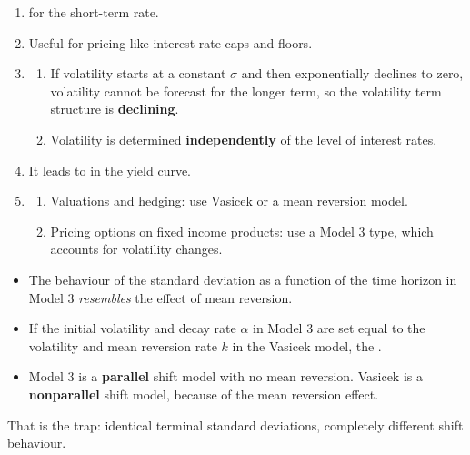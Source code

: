 
\begin{mrkeybox}[title={Model 3 effectiveness}]
\begin{enumerate}
\item {} for the short-term rate.
\item Useful for pricing  like interest rate caps and floors.
\item {}
  \begin{enumerate}[label=\alph*)]
  \item If volatility starts at a constant $\sigma$ and then exponentially declines to zero,
        volatility cannot be forecast for the longer term, so the volatility term structure is
        \textbf{declining}.
  \item Volatility is determined \textbf{independently} of the level of interest rates.
  \end{enumerate}
\item It leads to  in the yield curve.
\item {}
  \begin{enumerate}[label=\alph*)]
  \item Valuations and hedging: use Vasicek or a mean reversion model.
  \item Pricing options on fixed income products: use a Model 3 type, which accounts for
        volatility changes.
  \end{enumerate}
\end{enumerate}
\end{mrkeybox}

\begin{mrtrapbox}[title={Model 3 versus Vasicek --- the sibling pair}]
\begin{itemize}
\item The behaviour of the standard deviation as a function of the time horizon in Model 3
      \textit{resembles} the effect of mean reversion.
\item If the initial volatility and decay rate $\alpha$ in Model 3 are set equal to the
      volatility and mean reversion rate $k$ in the Vasicek model, the .
\item {} Model 3 is a \textbf{parallel} shift model with no mean reversion.
      Vasicek is a \textbf{nonparallel} shift model, because of the mean reversion effect.
\end{itemize}
That is the trap: identical terminal standard deviations, completely different shift behaviour.
\end{mrtrapbox}


